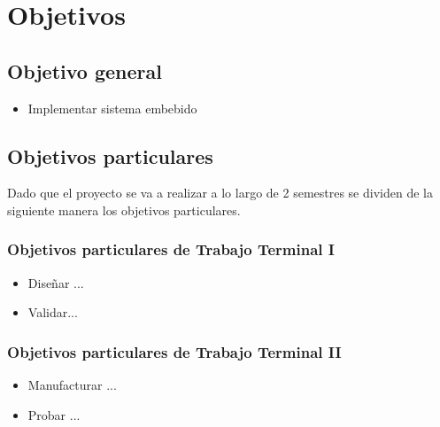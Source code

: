 \section{Objetivos}

\subsection{Objetivo general}
\label{Objetivo general}
\begin{itemize}
	\item Implementar sistema embebido
\end{itemize}

\subsection{Objetivos particulares}
\label{Objetivos part}
Dado que el proyecto se va a realizar a lo largo de 2 semestres se dividen de la siguiente manera los objetivos particulares.

\subsubsection{Objetivos particulares de Trabajo Terminal I}
\begin{itemize}
	\item Diseñar ...
	\item Validar...
\end{itemize}

\subsubsection{Objetivos particulares de Trabajo Terminal II}
\begin{itemize}
	\item Manufacturar ...
	\item Probar ...
\end{itemize}